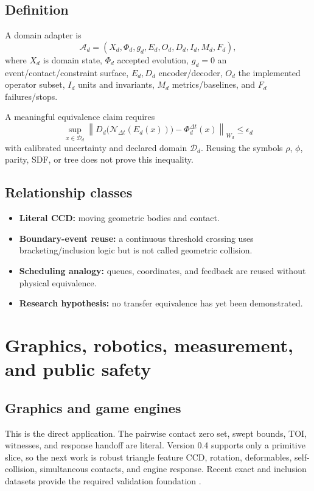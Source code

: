 \documentclass[11pt,a4paper,openany]{book}
\begin{document}
\section{Definition}
A domain adapter is
\begin{equation}
\mathcal{A}_d=(X_d,\Phi_d,g_d,E_d,O_d,D_d,I_d,M_d,F_d),
\end{equation}
where $X_d$ is domain state, $\Phi_d$ accepted evolution, $g_d=0$ an event/contact/constraint surface, $E_d,D_d$ encoder/decoder, $O_d$ the implemented operator subset, $I_d$ units and invariants, $M_d$ metrics/baselines, and $F_d$ failures/stops.

A meaningful equivalence claim requires
\begin{equation}
\sup_{x\in\mathcal{D}_d}\left\|D_d\big(\mathcal{N}_{\Delta t}(E_d(x))\big)-\Phi_d^{\Delta t}(x)\right\|_{W_d}\le\epsilon_d
\end{equation}
with calibrated uncertainty and declared domain $\mathcal{D}_d$. Reusing the symbols $\rho$, $\phi$, parity, SDF, or tree does not prove this inequality.

\section{Relationship classes}
\begin{itemize}
  \item \textbf{Literal CCD:} moving geometric bodies and contact.
  \item \textbf{Boundary-event reuse:} a continuous threshold crossing uses bracketing/inclusion logic but is not called geometric collision.
  \item \textbf{Scheduling analogy:} queues, coordinates, and feedback are reused without physical equivalence.
  \item \textbf{Research hypothesis:} no transfer equivalence has yet been demonstrated.
\end{itemize}



\chapter{Graphics, robotics, measurement, and public safety}
\section{Graphics and game engines}
This is the direct application. The pairwise contact zero set, swept bounds, TOI, witnesses, and response handoff are literal. Version 0.4 supports only a primitive slice, so the next work is robust triangle feature CCD, rotation, deformables, self-collision, simultaneous contacts, and engine response. Recent exact and inclusion datasets provide the required validation foundation \citep{wang2021tight,belgrod2023toi}.
\end{document}
